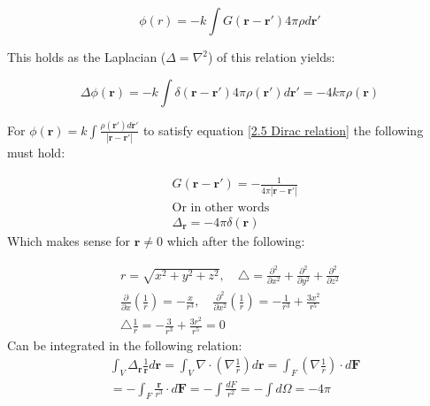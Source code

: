 \begin{equation}
    \phi(r) = -k \int G(\textbf{r}-\textbf{r}')4\pi \rho d \textbf{r}'
    \label{2.5 Dirac relation}
\end{equation}

\noindent This holds as the Laplacian ($\Delta = \nabla^2$) of this relation yields:

\begin{equation}
    \Delta \phi(\textbf{r}) = -k\int \delta(\textbf{r}-\textbf{r}') 4\pi \rho(\textbf{r}') d\textbf{r}' = -4k\pi\rho(\textbf{r})
\end{equation}

For $\phi(\textbf{r}) = k \int \frac{\rho(\textbf{r}')d\textbf{r}'}{|\textbf{r}-\textbf{r}'|}$ to satisfy equation \ref{2.5 Dirac relation} the following must hold:

\begin{equation}
    \begin{aligned}
    &G(\textbf{r}-\textbf{r}') = -\frac{1}{4\pi |\textbf{r}-\textbf{r}'|}\\
    &\text{Or in other words}\\
    &\Delta_{\textbf{r}} = -4\pi \delta(\textbf{r})
    \end{aligned}
    \label{2.5 poisson}
\end{equation}
Which makes sense for $\textbf{r} \neq 0$ which after the following:

\begin{equation}
\begin{array}{c}
r=\sqrt{x^{2}+y^{2}+z^{2}}, \quad \triangle=\frac{\partial^{2}}{\partial x^{2}}+\frac{\partial^{2}}{\partial y^{2}}+\frac{\partial^{2}}{\partial z^{2}} \\

\frac{\partial}{\partial x}\left(\frac{1}{r}\right)=-\frac{x}{r^{3}}, \quad \frac{\partial^{2}}{\partial x^{2}}\left(\frac{1}{r}\right)=-\frac{1}{r^{3}}+\frac{3 x^{2}}{r^{5}}\\

\triangle \frac{1}{r}=-\frac{3}{r^{3}}+\frac{3 r^{2}}{r^{5}}=0
\end{array}
\end{equation}
Can be integrated in the following relation:
\begin{equation}
    \begin{aligned}
    &\int_V \Delta_\textbf{r} \frac{1}{\textbf{r}}d \textbf{r} = \int_V \nabla \cdot (\nabla\frac{1}{r})d\textbf{r} = \int_F (\nabla \frac{1}{r}) \cdot d\textbf{F}\\
   & = -\int_F \frac{\textbf{r}}{r^3}\cdot d \textbf{F} = -\int \frac{dF}{r^2}= -\int d\Omega = -4\pi\\
   \end{aligned} 
\end{equation}

